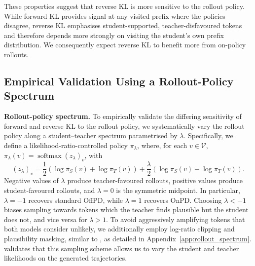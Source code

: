 \documentclass{article} %
\theoremstyle{plain}
\theoremstyle{definition}
\theoremstyle{remark}
\begin{document}
These properties suggest that reverse KL is more sensitive to the rollout policy. While forward KL provides signal at any visited prefix where the policies disagree, reverse KL emphasises student-supported, teacher-disfavoured tokens and therefore depends more strongly on visiting the student’s own prefix distribution. We consequently expect reverse KL to benefit more from on-policy rollouts.


\subsection{Empirical Validation Using a Rollout-Policy Spectrum}

\textbf{Rollout-policy spectrum.} To empirically validate the differing sensitivity of forward and reverse KL to the rollout policy, we systematically vary the rollout policy along a student--teacher spectrum parametrised by $\lambda$. Specifically, we define a likelihood-ratio-controlled policy $\pi_\lambda$, where, for each $v\in\mathcal{V}$, $\pi_\lambda(v)=\operatorname{softmax}(z_\lambda)_v$, with
$$
(z_\lambda)_v
= \frac{1}{2}\left(\log\pi_S(v)+\log\pi_T(v)\right)
+
\frac{\lambda}{2}\left(\log\pi_S(v)-\log\pi_T(v)\right).
$$
Negative values of $\lambda$ produce teacher-favoured rollouts, positive values produce student-favoured rollouts, and $\lambda=0$ is the symmetric midpoint. In particular, $\lambda=-1$ recovers standard OffPD, while $\lambda=1$ recovers OnPD. Choosing $\lambda<-1$ biases sampling towards tokens which the teacher finds plausible but the student does not, and vice versa for $\lambda>1$. To avoid aggressively amplifying tokens that both models consider unlikely, we additionally employ log-ratio clipping and plausibility masking, similar to \citet{li2023contrastivedecodingopenendedtext}, as detailed in Appendix~\ref{app:rollout_spectrum}.  validates that this sampling scheme allows us to vary the student and teacher likelihoods on the generated trajectories.
\end{document}
